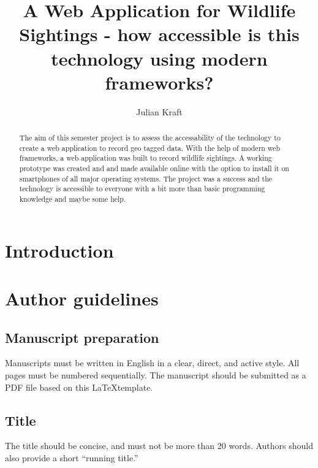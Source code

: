 \documentclass{josis}
\begin{document}


\title{A Web Application for Wildlife Sightings - how accessible is this technology using modern frameworks?}

\author{Julian Kraft}

\maketitle


\begin{abstract}
The aim of this semester project is to assess the accessability of the technology to create a web application to record geo tagged data.
With the help of modern web frameworks, a web application was built to record wildlife sightings. A working prototype was created and and made
available online with the option to install it on smartphones of all major operating systems.
The project was a success and the technology is accessible to everyone with a bit more than basic programming knowledge and maybe some help.

\end{abstract}

\section{Introduction}


\section{Author guidelines}

\subsection{Manuscript preparation}
Manuscripts must be written in English in a clear, direct, and active style. All pages must be numbered sequentially. The manuscript should be submitted as a PDF file based on this \LaTeX template. 

\subsection{Title}
The title should be concise, and must not be more than 20 words. Authors should also provide a short ``running title.''
\end{document}

